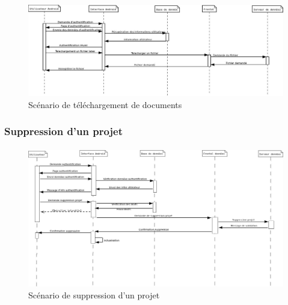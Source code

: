 \documentclass[a4paper,12pt]{article}
\begin{document}
\paragraph{}
\begin{figure}[!ht]
\begin{center}
  \includegraphics[width=1\textwidth, angle=90]{./Diagramme/Android/FichierLatexTelechargement.jpg}
\end{center}
  \caption{Scénario de téléchargement de documents}
  \label{androidDownload}
\end{figure}

\newpage
\subsubsection{Suppression d'un projet}
\paragraph{}
\begin{figure}[!ht]
\begin{center}
  \includegraphics[width=1\textwidth, angle=90]{./Diagramme/Android/SuppressionProjetViaAndroid.jpeg}
\end{center}
  \caption{Scénario de suppression d'un projet}
  \label{androidDel}
\end{figure}
\end{document}
